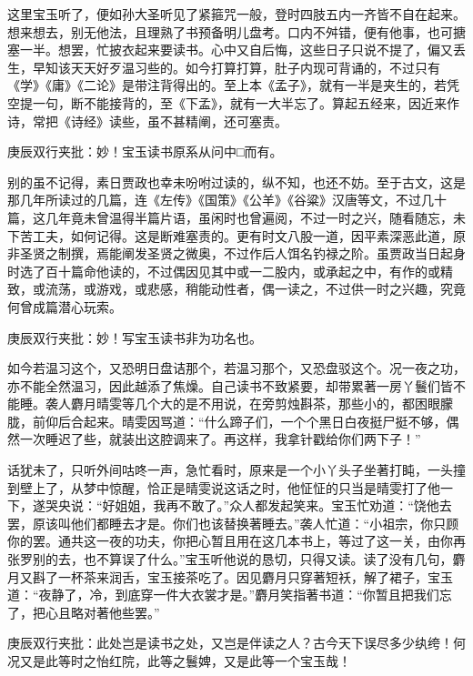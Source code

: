 \begin{parag}
    这里宝玉听了，便如孙大圣听见了紧箍咒一般，登时四肢五内一齐皆不自在起来。想来想去，别无他法，且理熟了书预备明儿盘考。口内不舛错，便有他事，也可搪塞一半。想罢，忙披衣起来要读书。心中又自后悔，这些日子只说不提了，偏又丢生，早知该天天好歹温习些的。如今打算打算，肚子内现可背诵的，不过只有《学》《庸》《二论》是带注背得出的。至上本《孟子》，就有一半是夹生的，若凭空提一句，断不能接背的，至《下孟》，就有一大半忘了。算起五经来，因近来作诗，常把《诗经》读些，虽不甚精阐，还可塞责。\begin{note}庚辰双行夹批：妙！宝玉读书原系从问中□而有。\end{note}别的虽不记得，素日贾政也幸未吩咐过读的，纵不知，也还不妨。至于古文，这是那几年所读过的几篇，连《左传》《国策》《公羊》《谷粱》汉唐等文，不过几十篇，这几年竟未曾温得半篇片语，虽闲时也曾遍阅，不过一时之兴，随看随忘，未下苦工夫，如何记得。这是断难塞责的。更有时文八股一道，因平素深恶此道，原非圣贤之制撰，焉能阐发圣贤之微奥，不过作后人饵名钓禄之阶。虽贾政当日起身时选了百十篇命他读的，不过偶因见其中或一二股内，或承起之中，有作的或精致，或流荡，或游戏，或悲感，稍能动性者，偶一读之，不过供一时之兴趣，究竟何曾成篇潜心玩索。\begin{note}庚辰双行夹批：妙！写宝玉读书非为功名也。\end{note}如今若温习这个，又恐明日盘诘那个，若温习那个，又恐盘驳这个。况一夜之功，亦不能全然温习，因此越添了焦燥。自己读书不致紧要，却带累著一房丫鬟们皆不能睡。袭人麝月晴雯等几个大的是不用说，在旁剪烛斟茶，那些小的，都困眼朦胧，前仰后合起来。晴雯因骂道：“什么蹄子们，一个个黑日白夜挺尸挺不够，偶然一次睡迟了些，就装出这腔调来了。再这样，我拿针戳给你们两下子！”
\end{parag}


\begin{parag}
    话犹未了，只听外间咕咚一声，急忙看时，原来是一个小丫头子坐著打盹，一头撞到壁上了，从梦中惊醒，恰正是晴雯说这话之时，他怔怔的只当是晴雯打了他一下，遂哭央说：“好姐姐，我再不敢了。”众人都发起笑来。宝玉忙劝道：“饶他去罢，原该叫他们都睡去才是。你们也该替换著睡去。”袭人忙道：“小祖宗，你只顾你的罢。通共这一夜的功夫，你把心暂且用在这几本书上，等过了这一关，由你再张罗别的去，也不算误了什么。”宝玉听他说的恳切，只得又读。读了没有几句，麝月又斟了一杯茶来润舌，宝玉接茶吃了。因见麝月只穿著短袄，解了裙子，宝玉道：“夜静了，冷，到底穿一件大衣裳才是。”麝月笑指著书道：“你暂且把我们忘了，把心且略对著他些罢。”\begin{note}庚辰双行夹批：此处岂是读书之处，又岂是伴读之人？古今天下误尽多少纨绔！何况又是此等时之怡红院，此等之鬟婢，又是此等一个宝玉哉！\end{note}
\end{parag}


